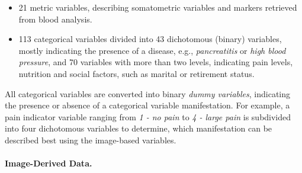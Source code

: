\documentclass[a4paper,twoside]{style/article}
\begin{document}
\begin{itemize}
	\item 21 metric variables, describing somatometric variables and markers retrieved from blood analysis.
	\item 113 categorical variables divided into 43 dichotomous (binary) variables, mostly indicating the presence of a disease, e.g., \emph{pancreatitis} or \emph{high blood pressure}, and 70 variables with more than two levels, indicating pain levels, nutrition and social factors, such as marital or retirement status.
\end{itemize}
All categorical variables are converted into binary \emph{dummy variables}, indicating the presence or absence of a categorical variable manifestation. %
For example, a pain indicator variable ranging from \emph{1 - no pain} to \emph{4 - large pain} is subdivided into four dichotomous variables to determine, which manifestation can be described best using the image-based variables.
\\\\
\noindent \textbf{Image-Derived Data.}
\end{document}
